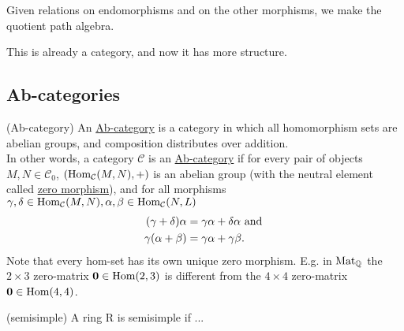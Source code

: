 Given relations on endomorphisms and on the other morphisms, we make the quotient path algebra.

This is already a category, and now it has more structure.

\subsection{Ab-categories}

\begin{definition}{(Ab-category)}
An \ul{Ab-category} is a category in which all homomorphism sets are abelian groups, and composition distributes over addition.\\
In other words, a category $\mathcal{C}$ is an \ul{Ab-category} if for every pair of objects $M,N \in \mathcal{C}_{0}$,
$( \textup{Hom}_{\mathcal{C}}(M,N), + )$ is an abelian group (with the neutral element called \ul{zero morphism}),
and for all morphisms $\gamma, \delta \in \textup{Hom}_{\mathcal{C}}(M,N),
\alpha, \beta \in \textup{Hom}_{\mathcal{C}}(N,L)$
\begin{align}\label{eq:dist}
(\gamma + \delta)\alpha &= \gamma\alpha + \delta\alpha \textup{ and }\\
\gamma(\alpha+\beta) &= \gamma\alpha + \gamma\beta.
\end{align}
Note that every hom-set has its own unique zero morphism. E.g. in $\textup{Mat}_{\mathbb{Q}}$ the $2 \times 3$ zero-matrix
$\mathbf{0} \in \textup{Hom}(2,3)$ is different from the $4 \times 4$ zero-matrix $\mathbf{0} \in \textup{Hom}(4,4)$.
\end{definition}

\begin{definition}{(semisimple)}
A ring R is semisimple if ...
\end{definition}

